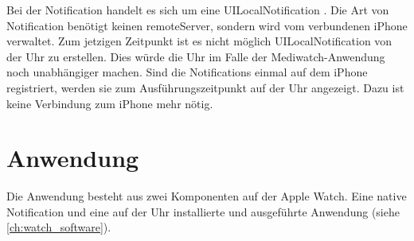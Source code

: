 Bei der Notification handelt es sich um eine UILocalNotification \cite{Apple:2015notif}. Die Art von Notification benötigt keinen \gls{remoteServer}, sondern wird vom verbundenen iPhone verwaltet. Zum jetzigen Zeitpunkt ist es nicht möglich UILocalNotification von der Uhr zu erstellen. Dies würde die Uhr im Falle der Mediwatch-Anwendung noch unabhängiger machen. Sind die Notifications einmal auf dem iPhone registriert, werden sie zum Ausführungszeitpunkt auf der Uhr angezeigt. Dazu ist keine Verbindung zum iPhone mehr nötig.

\section{Anwendung}

Die Anwendung besteht aus zwei Komponenten auf der Apple Watch. Eine native Notification  und eine auf der Uhr installierte und ausgeführte Anwendung (siehe \ref{ch:watch_software}).

